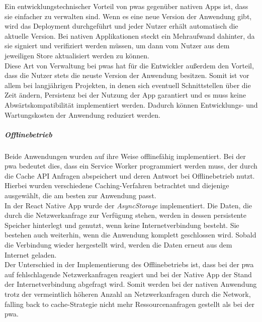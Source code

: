 Ein entwicklungstechnischer Vorteil von \acp{pwa} gegenüber nativen Apps ist, dass sie einfacher zu verwalten sind.
Wenn es eine neue Version der Anwendung gibt, wird das Deployment durchgeführt und jeder Nutzer erhält automatisch die aktuelle Version.
Bei nativen Applikationen steckt ein Mehraufwand dahinter, da sie signiert und verifiziert werden müssen, um dann vom Nutzer aus dem jeweiligen Store aktualisiert werden zu können.\\
Diese Art von Verwaltung bei \acp{pwa} hat für die Entwickler außerdem den Vorteil, dass die Nutzer stets die neuste Version der Anwendung besitzen.
Somit ist vor allem bei langjährigen Projekten, in denen sich eventuell Schnittstellen über die Zeit ändern, Persistenz bei der Nutzung der App garantiert und es muss keine Abwärtskompatibilität implementiert werden.
Dadurch können Entwicklungs- und Wartungskosten der Anwendung reduziert werden.

\subparagraph{Offlinebetrieb\\}
Beide Anwendungen wurden auf ihre Weise offlinefähig implementiert.
Bei der \ac{pwa} bedeutet dies, dass ein Service Worker programmiert werden muss, der durch die Cache API Anfragen abspeichert und deren Antwort bei Offlinebetrieb nutzt.
Hierbei wurden verschiedene Caching-Verfahren betrachtet und diejenige ausgewählt, die am besten zur Anwendung passt.\\
In der React Native App wurde der \textit{AsyncStorage} implementiert.
Die Daten, die durch die Netzwerkanfrage zur Verfügung stehen, werden in dessen persistente Speicher hinterlegt und genutzt, wenn keine Internetverbindung besteht.
Sie bestehen auch weiterhin, wenn die Anwendung komplett geschlossen wird.
Sobald die Verbindung wieder hergestellt wird, werden die Daten erneut aus dem Internet geladen.\\
Der Unterschied in der Implementierung des Offlinebetriebs ist, dass bei der \ac{pwa} auf fehlschlagende Netzwerkanfragen reagiert und bei der Native App der Stand der Internetverbindung abgefragt wird.
Somit werden bei der nativen Anwendung trotz der vermeintlich höheren Anzahl an Netzwerkanfragen durch die \glqq Network, falling back to cache\grqq{}-Strategie nicht mehr Ressourcenanfragen gestellt als bei der \ac{pwa}.

